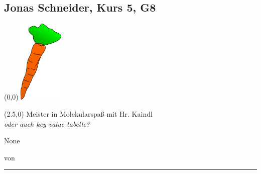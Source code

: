 \subsection*{Jonas Schneider, Kurs 5, G8}
\begin{textblock}{2.5}(0,0)
	\noindent\mbox{\includegraphics[height=4cm ]{karotte2.png}} %
\end{textblock}

\begin{textblock}{10}(2.5,0)
	\setlength{\parindent}{0cm}
	Meister in Molekularspaß mit Hr. Kaindl \\
	
	
	{\em oder auch key-value-tabelle?}
\end{textblock}

\vspace{4.5cm}
None

\vspace{3mm}
von 
\vfill
\hrule
\vspace{2mm}
{\small

}

\newpage
